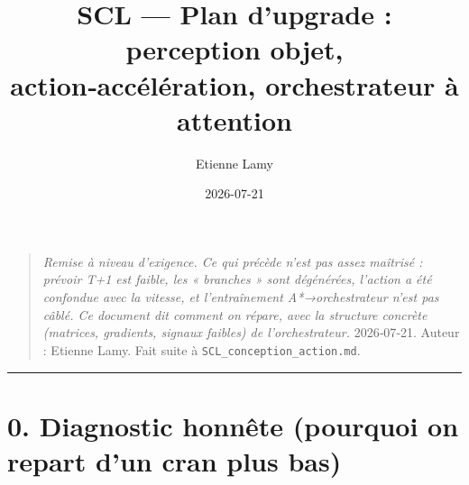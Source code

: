 \documentclass[
  french,
  11pt,
]{article}
\title{SCL --- Plan d'upgrade : perception objet, action‑accélération,
orchestrateur à attention}
\author{Etienne Lamy}
\date{2026-07-21}
\begin{document}
\maketitle

{
\hypersetup{linkcolor=black}
\setcounter{tocdepth}{2}
\tableofcontents
}
\begin{quote}
\emph{Remise à niveau d'exigence. Ce qui précède n'est pas assez
maîtrisé : prévoir T+1 est faible, les « branches » sont dégénérées,
l'action a été confondue avec la vitesse, et l'entraînement
A*→orchestrateur n'est pas câblé. Ce document dit comment on répare,
avec la structure concrète (matrices, gradients, signaux faibles) de
l'orchestrateur.} 2026‑07‑21. Auteur : Etienne Lamy. Fait suite à
\texttt{SCL\_conception\_action.md}.
\end{quote}

\begin{center}\rule{0.5\linewidth}{0.5pt}\end{center}

\section{0. Diagnostic honnête (pourquoi on repart d'un cran plus
bas)}\label{diagnostic-honnuxeate-pourquoi-on-repart-dun-cran-plus-bas}
\end{document}
